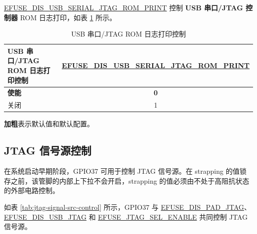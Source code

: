 \documentclass[main\_\_CN.tex]{subfiles}
\begin{document}
\hyperref[fielddesc:EFUSEDISUSBSERIALJTAGROMPRINT]{EFUSE\_DIS\_USB\_SERIAL\_JTAG\_ROM\_PRINT} 控制 \textbf{USB 串口/JTAG 控制器} ROM 日志打印，如表 \ref{tab:usb-rom-msg-printing-control} \textit{} 所示。

\begin{table}[H]
    \centering
    \caption{USB 串口/JTAG ROM 日志打印控制}
    \label{tab:usb-rom-msg-printing-control}

    \begin{threeparttable}

    \begin{tabular}{ | l | c |}
    \hline
    
    \rowcolor{lightgray}
    \textbf{USB 串口/JTAG ROM 日志打印控制} & \textbf{\hyperref[fielddesc:EFUSEDISUSBSERIALJTAGROMPRINT]{EFUSE\_DIS\_USB\_SERIAL\_JTAG\_ROM\_PRINT}} \\\hline

    \textbf{使能} & \textbf{0} \\\hline
    关闭 & 1 \\\hline
    
    \end{tabular}

        \begin{tablenotes}
            \item[1] \textbf{加粗}表示默认值和默认配置。
        \end{tablenotes}
        
    \end{threeparttable}
\end{table}


\subsection{JTAG 信号源控制}

在系统启动早期阶段，GPIO37 可用于控制 JTAG 信号源。在 strapping 的值锁存之前，该管脚的内部上下拉不会开启，strapping 的值必须由不处于高阻抗状态的外部电路控制。

如表 \ref{tab:jtag-signal-src-control} \textit{} 所示，GPIO37 与 \hyperref[fielddesc:EFUSEDISPADJTAG]{EFUSE\_DIS\_PAD\_JTAG}、\hyperref[fielddesc:EFUSEDISUSBJTAG]{EFUSE\_DIS\_USB\_JTAG} 和 \hyperref[fielddesc:EFUSEJTAGSELENABLE]{EFUSE\_JTAG\_SEL\_ENABLE} 共同控制 JTAG 信号源。


\setlength\tabcolsep{3pt}
\end{document}
